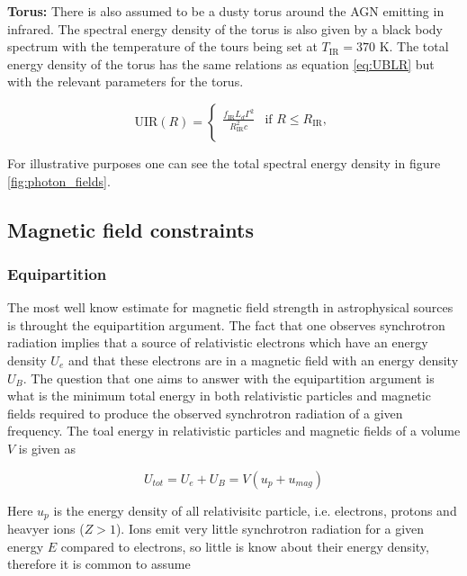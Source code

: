 \textbf{Torus:} There is also assumed to be a dusty torus around the AGN emitting in infrared. The spectral energy density of the torus is also given by 
a black body spectrum with the temperature of the tours being set at $T_{\text{IR}} = 370$ K. The total energy density of the torus has the same relations 
as equation \ref{eq:UBLR} but with the relevant parameters for the torus.

\begin{equation}
    \text{UIR}(R) = 
    \begin{cases}
    \frac{f_{\text{IR}}L_d  \Gamma^2}{R_{\text{IR}}^2 c} & \text{if } R \leq R_{\text{IR}}, \\
    \end{cases}
\end{equation}

For illustrative purposes one can see the total spectral energy density in figure \ref{fig:photon_fields}. 


\subsection{Magnetic field constraints}

\subsubsection{Equipartition}
\label{sec:equipartition}
The most well know estimate for magnetic field strength in astrophysical sources is throught the equipartition argument. The fact that one observes synchrotron radiation implies that a source of relativistic electrons which have an energy density $U_e$ and that these electrons are in a magnetic field with an energy density $U_B$. The question that one aims to answer with the equipartition argument is what is the minimum total energy in both relativistic particles and magnetic fields required to produce the observed synchrotron radiation of a given frequency. The toal energy in relativistic particles and magnetic fields of a volume $V$ is given as 

\begin{equation}
    U_{tot} = U_e + U_B = V(u_p + u_{mag})
\end{equation}

Here $u_p$ is the energy density of all relativisitc particle, i.e. electrons, protons and heavyer ions ($Z>1$). Ions emit very little synchrotron radiation for a given energy $E$ compared to electrons, so little is know about their energy density, therefore it is common to assume 

